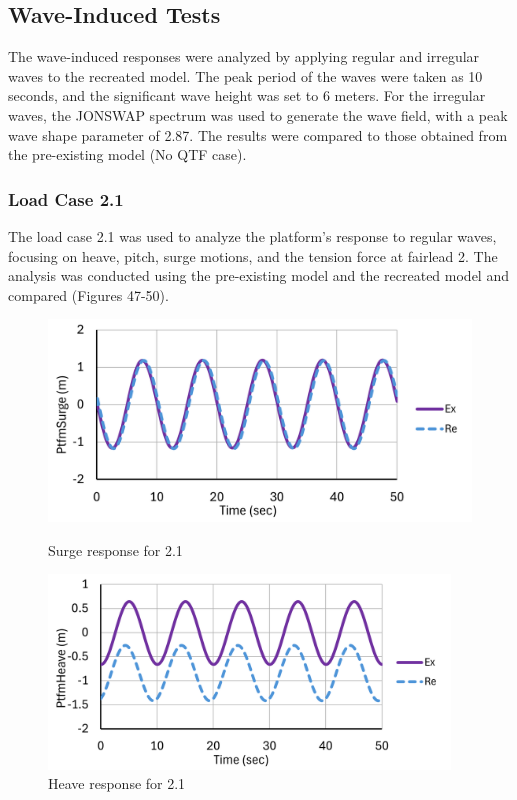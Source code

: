 \documentclass[a4paper, 11pt]{article}
\begin{document}
\subsection{Wave-Induced Tests}

\hspace*{0.5cm}The wave-induced responses were analyzed by applying regular and irregular waves to the recreated model. The peak period of the waves were taken as 10 seconds, and the significant wave height was set to 6 meters. For the irregular waves, the JONSWAP spectrum was used to generate the wave field, with a peak wave shape parameter of 2.87. The results were compared to those obtained from the pre-existing model (No QTF case).

\subsubsection{Load Case 2.1}
\hspace*{0.5cm}The load case 2.1 was used to analyze the platform’s response to regular waves, focusing on heave, pitch, surge motions, and the tension force at fairlead 2. The analysis was conducted using the pre-existing model and the recreated model and compared (Figures 47-50).

\begin{figure}[H]
    \begin{minipage}{0.48\textwidth}
        \centering
        \includegraphics[width=1\textwidth]{2.1_surge_mine_1.png}
        \caption{\small Surge response for 2.1}
        \label{fig:2.1_surge_mine_recreated}
    \end{minipage}
    \hfill
    \begin{minipage}{0.5\textwidth}
        \centering
        \includegraphics[width=0.95\textwidth]{2.1_heave_mine_1.png}
        \caption{\small Heave response for 2.1}
        \label{fig:2.1_heave_mine_recreated}
    \end{minipage}
\end{figure}
\end{document}
